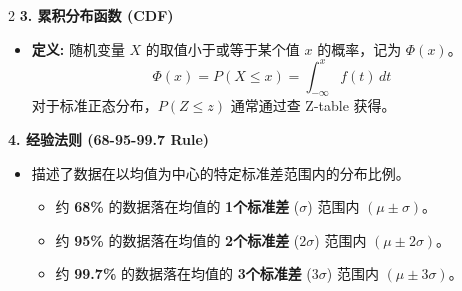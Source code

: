 \documentclass[9pt,a4paper]{article} %
\begin{document}
\begin{multicols}{2}
\textbf{3. 累积分布函数 (CDF)}
\begin{itemize}
    \item \textbf{定义:} 随机变量 $X$ 的取值小于或等于某个值 $x$ 的概率，记为 $\Phi(x)$。
    $$ \Phi(x) = P(X \le x) = \int_{-\infty}^{x} f(t) \,dt $$
    对于标准正态分布，$P(Z \le z)$ 通常通过查 Z-table 获得。
\end{itemize}

\textbf{4. 经验法则 (68-95-99.7 Rule)}
\begin{itemize}
    \item 描述了数据在以均值为中心的特定标准差范围内的分布比例。
    \begin{itemize}
        \item 约 \textbf{68\%} 的数据落在均值的 \textbf{1个标准差} ($\sigma$) 范围内 $(\mu \pm \sigma)$。
        \item 约 \textbf{95\%} 的数据落在均值的 \textbf{2个标准差} ($2\sigma$) 范围内 $(\mu \pm 2\sigma)$。
        \item 约 \textbf{99.7\%} 的数据落在均值的 \textbf{3个标准差} ($3\sigma$) 范围内 $(\mu \pm 3\sigma)$。
    \end{itemize}
\end{itemize}
\end{multicols}
\end{document}
